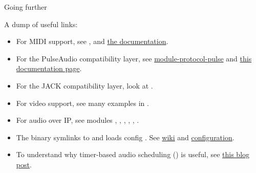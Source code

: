 \begin{frame}{Going further}

  A dump of useful links:

  \begin{itemize}

  \item For MIDI support, see , 
    and \href{https://docs.pipewire.org/page_midi.html}{the documentation}.

  \item For the PulseAudio compatibility layer, see
    \href{https://docs.pipewire.org/page_module_protocol_pulse.html}{module-protocol-pulse}
    and
    \href{https://docs.pipewire.org/page_pulseaudio.html}{this documentation page}.

  \item For the JACK compatibility layer, look at .

  \item For video support, see many examples in .

  \item For audio over IP, see modules , ,
    , , , .

  \item The  binary symlinks to 
    and loads config . See
    \href{https://gitlab.freedesktop.org/pipewire/pipewire/-/wikis/AES67}{wiki}
    and \href{https://gitlab.freedesktop.org/pipewire/pipewire/-/blob/master/src/daemon/pipewire-aes67.conf.in}{configuration}.

  \item To understand why timer-based audio scheduling () is
    useful, see
    \href{https://0pointer.net/blog/projects/pulse-glitch-free.html}{this blog post}.

  \end{itemize}
\end{frame}
